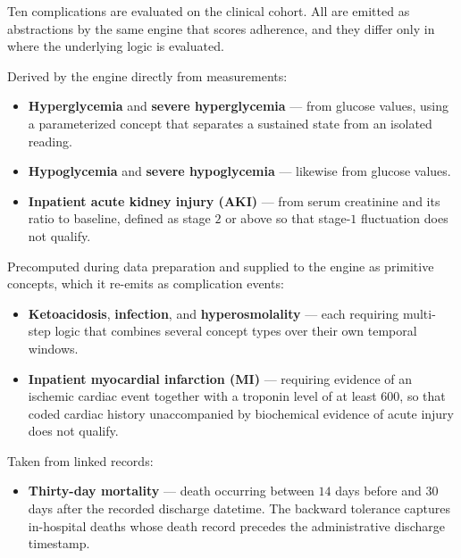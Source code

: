 Ten complications are evaluated on the clinical cohort. All are emitted as abstractions by the same engine that scores adherence, and they differ only in where the underlying logic is evaluated.

Derived by the engine directly from measurements:

\begin{itemize}
\item \textbf{Hyperglycemia} and \textbf{severe hyperglycemia} --- from glucose values, using a parameterized concept that separates a sustained state from an isolated reading.
\item \textbf{Hypoglycemia} and \textbf{severe hypoglycemia} --- likewise from glucose values.
\item \textbf{Inpatient acute kidney injury (AKI)} --- from serum creatinine and its ratio to baseline, defined as stage $2$ or above so that stage-$1$ fluctuation does not qualify.
\end{itemize}

Precomputed during data preparation and supplied to the engine as primitive concepts, which it re-emits as complication events:

\begin{itemize}
\item \textbf{Ketoacidosis}, \textbf{infection}, and \textbf{hyperosmolality} --- each requiring multi-step logic that combines several concept types over their own temporal windows.
\item \textbf{Inpatient myocardial infarction (MI)} --- requiring evidence of an ischemic cardiac event together with a troponin level of at least $600$, so that coded cardiac history unaccompanied by biochemical evidence of acute injury does not qualify.
\end{itemize}

Taken from linked records:

\begin{itemize}
\item \textbf{Thirty-day mortality} --- death occurring between $14$ days before and $30$ days after the recorded discharge datetime. The backward tolerance captures in-hospital deaths whose death record precedes the administrative discharge timestamp.
\end{itemize}
